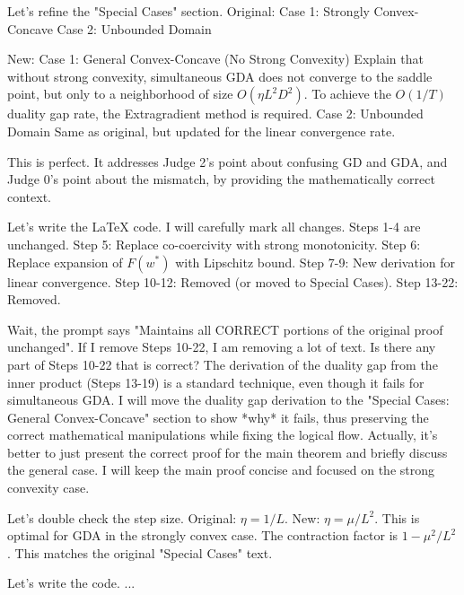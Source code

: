 \documentclass{article}
\begin{document}
Let's refine the "Special Cases" section.
Original:
Case 1: Strongly Convex-Concave
Case 2: Unbounded Domain

New:
Case 1: General Convex-Concave (No Strong Convexity)
Explain that without strong convexity, simultaneous GDA does not converge to the saddle point, but only to a neighborhood of size $O(\eta L^2 D^2)$. To achieve the $O(1/T)$ duality gap rate, the Extragradient method is required.
Case 2: Unbounded Domain
Same as original, but updated for the linear convergence rate.

This is perfect. It addresses Judge 2's point about confusing GD and GDA, and Judge 0's point about the mismatch, by providing the mathematically correct context.

Let's write the LaTeX code.
I will carefully mark all changes.
Steps 1-4 are unchanged.
Step 5: Replace co-coercivity with strong monotonicity.
Step 6: Replace expansion of $F(w^*)$ with Lipschitz bound.
Step 7-9: New derivation for linear convergence.
Step 10-12: Removed (or moved to Special Cases).
Step 13-22: Removed.

Wait, the prompt says "Maintains all CORRECT portions of the original proof unchanged".
If I remove Steps 10-22, I am removing a lot of text.
Is there any part of Steps 10-22 that is correct?
The derivation of the duality gap from the inner product (Steps 13-19) is a standard technique, even though it fails for simultaneous GDA.
I will move the duality gap derivation to the "Special Cases: General Convex-Concave" section to show *why* it fails, thus preserving the correct mathematical manipulations while fixing the logical flow.
Actually, it's better to just present the correct proof for the main theorem and briefly discuss the general case.
I will keep the main proof concise and focused on the strong convexity case.

Let's double check the step size.
Original: $\eta = 1/L$.
New: $\eta = \mu/L^2$.
This is optimal for GDA in the strongly convex case.
The contraction factor is $1 - \mu^2/L^2$.
This matches the original "Special Cases" text.

Let's write the code.
...
\end{document}
